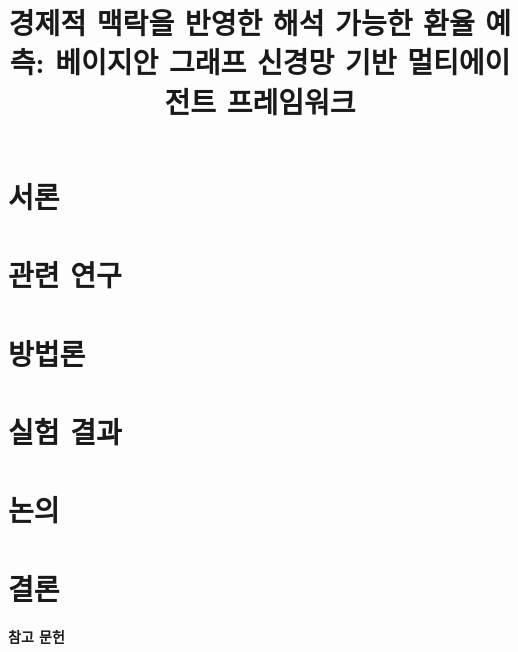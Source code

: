\documentclass{kcc}
\title{경제적 맥락을 반영한 해석 가능한 환율 예측: 베이지안 그래프 신경망 기반 멀티에이전트 프레임워크}
\author{}
\begin{document}
\maketitle

\section{서론}


\section{관련 연구}


\section{방법론}


\section{실험 결과}


\section{논의}


\section{결론}


\vspace{1.0em}
{\centering\large\bfseries 참고 문헌\par}
\begingroup
\renewcommand{\section}[2]{}
\renewcommand{\refname}{}

\end{document}

